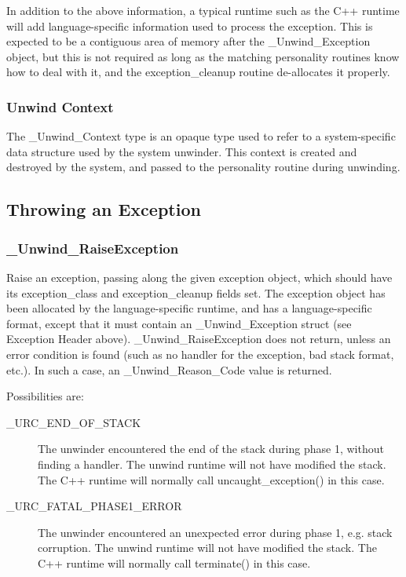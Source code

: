 In addition to the above information, a typical runtime such as the
C++ runtime will add language-specific information used to process
the exception.  This is expected to be a contiguous area of memory
after the \_Unwind\_Exception object, but this is not required as long
as the matching personality routines know how to deal with it, and the
exception\_cleanup routine de-allocates it properly.

\subsubsection{Unwind Context}

The \_Unwind\_Context type is an opaque type used to refer to a
system-specific data structure used by the system unwinder.  This context
is created and destroyed by the system, and passed to the personality
routine during unwinding.


\subsection{Throwing an Exception}

\subsubsection{\_Unwind\_RaiseException}


Raise an exception, passing along the given exception object,
which should have its exception\_class and exception\_cleanup fields
set. The exception object has been allocated by the language-specific
runtime, and has a language-specific format, except that it must
contain an \_Unwind\_Exception struct (see Exception Header above).
\_Unwind\_RaiseException does not return, unless an error condition is
found (such as no handler for the exception, bad stack format, etc.).
In such a case, an \_Unwind\_Reason\_Code value is returned.

Possibilities are: 
\begin{description}
\item[\_URC\_END\_OF\_STACK] The unwinder encountered the end of the 
   stack during phase 1, without finding a handler. The unwind runtime 
   will not have modified the stack. The C++ runtime will normally call 
   uncaught\_exception() in this case. 
\item[\_URC\_FATAL\_PHASE1\_ERROR] The unwinder encountered an unexpected 
   error during phase 1, e.g. stack corruption. The unwind runtime will 
   not have modified the stack. The C++ runtime will normally call 
   terminate() in this case. 
\end{description}

